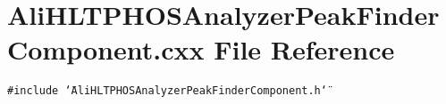 \section{Ali\-HLTPHOSAnalyzer\-Peak\-Finder\-Component.cxx File Reference}
\label{AliHLTPHOSAnalyzerPeakFinderComponent_8cxx}
{\tt \#include \char`\"{}Ali\-HLTPHOSAnalyzer\-Peak\-Finder\-Component.h\char`\"{}}\par
